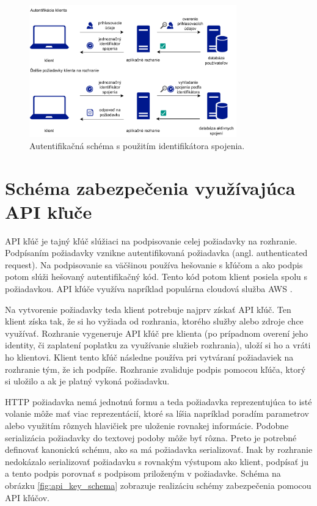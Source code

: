 \begin{figure}
    \centerline{\includegraphics[width=0.8\textwidth]{images/session_schema}}
    \caption[Schéma s použitím identifikátora spojenia]{Autentifikačná schéma s použitím identifikátora spojenia.}
    \label{obr:session}
\end{figure}

\section{Schéma zabezpečenia využívajúca API kľuče}

API kľúč je tajný kľúč slúžiaci na podpisovanie celej požiadavky na rozhranie. Podpísaním požiadavky vznikne autentifikovaná požiadavka (angl. authenticated request). Na podpisovanie sa väčšinou používa hešovanie s kľúčom a ako podpis potom slúži hešovaný autentifikačný kód. Tento kód potom klient posiela spolu s požiadavkou. API kľúče využíva napríklad populárna cloudová služba AWS \cite{aws_auth}.

Na vytvorenie požiadavky teda klient potrebuje najprv získať API kľúč. Ten klient získa tak, že si ho vyžiada od rozhrania, ktorého služby alebo zdroje chce využívať. Rozhranie vygeneruje API kľúč pre klienta (po prípadnom overení jeho identity, či zaplatení poplatku za využívanie služieb rozhrania), uloží si ho a vráti ho klientovi. Klient tento kľúč následne používa pri vytváraní požiadaviek na rozhranie tým, že ich podpíše. Rozhranie zvaliduje podpis pomocou kľúča, ktorý si uložilo a ak je platný vykoná požiadavku.

HTTP požiadavka nemá jednotnú formu a teda požiadavka reprezentujúca to isté volanie môže mať viac reprezentácií, ktoré sa líšia napríklad poradím parametrov alebo využitím rôznych hlavičiek pre uloženie rovnakej informácie. Podobne serializácia požiadavky do textovej podoby môže byť rôzna. Preto je potrebné definovať kanonickú schému, ako sa má požiadavka serializovať. Inak by rozhranie nedokázalo serializovať požiadavku s rovnakým výstupom ako klient, podpísať ju a tento podpis porovnať s podpisom priloženým v požiadavke. Schéma na obrázku \ref{fig:api_key_schema} zobrazuje realizáciu schémy zabezpečenia pomocou API kľúčov.

